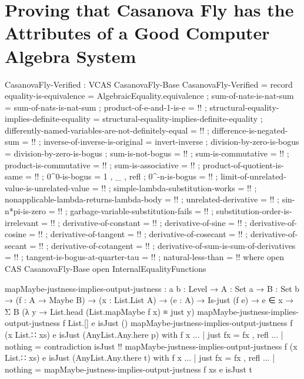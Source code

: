 \documentclass{report}
\begin{document}
\chapter{Proving that Casanova Fly has the Attributes of a Good Computer Algebra System}

\begin{code}
CasanovaFly-Verified : VCAS CasanovaFly-Base
CasanovaFly-Verified = record
  { equality-is-equivalence = AlgebraicEquality.equivalence
  ; sum-of-nats-is-nat-sum = sum-of-nats-is-nat-sum
  ; product-of-e-and-1-is-e = {!!}
  ; structural-equality-implies-definite-equality =
    structural-equality-implies-definite-equality
  ; differently-named-variables-are-not-definitely-equal = {!!}
  ; difference-is-negated-sum = {!!}
  ; inverse-of-inverse-is-original = invert-inverse
  ; division-by-zero-is-bogus = division-by-zero-is-bogus
  ; sum-is-not-bogus = {!!}
  ; sum-is-commutative = {!!}
  ; product-is-commutative = {!!}
  ; sum-is-associative = {!!}
  ; product-of-quotient-is-same = {!!}
  ; 0^0-is-bogus = 1 , _ , refl
  ; 0^-n-is-bogus = {!!}
  ; limit-of-unrelated-value-is-unrelated-value = {!!}
  ; simple-lambda-substitution-works = {!!}
  ; nonapplicable-lambda-returns-lambda-body = {!!}
  ; unrelated-derivative = {!!}
  ; sin-n*pi-is-zero = {!!}
  ; garbage-variable-substitution-fails = {!!}
  ; substitution-order-is-irrelevant = {!!}
  ; derivative-of-constant = {!!}
  ; derivative-of-sine = {!!}
  ; derivative-of-cosine = {!!}
  ; derivative-of-tangent = {!!}
  ; derivative-of-cosecant = {!!}
  ; derivative-of-secant = {!!}
  ; derivative-of-cotangent = {!!}
  ; derivative-of-sum-is-sum-of-derivatives = {!!}
  ; tangent-is-bogus-at-quarter-tau = {!!}
  ; natural-less-than = {!!}
  }
  where
  open CAS CasanovaFly-Base
  open InternalEqualityFunctions

  mapMaybe-justness-implies-output-justness :
    {a b : Level} →
    {A : Set a} →
    {B : Set b} →
    (f : A → Maybe B) →
    (x : List.List A) →
    (e : A) →
    Is-just (f e) →
    e ∈ x →
    Σ B (λ y → List.head (List.mapMaybe f x) ≡ just y)
  mapMaybe-justness-implies-output-justness
    f List.[] e isJust ()
  mapMaybe-justness-implies-output-justness
    f (x List.∷ xs) e isJust (AnyList.Any.here p) with f x
  ... | just fx = fx , refl
  ... | nothing = contradiction isJust {!!}
  mapMaybe-justness-implies-output-justness
    f (x List.∷ xs) e isJust (AnyList.Any.there t) with f x
  ... | just fx = fx , refl
  ... | nothing = mapMaybe-justness-implies-output-justness f xs e isJust t


\end{code}
\end{document}
